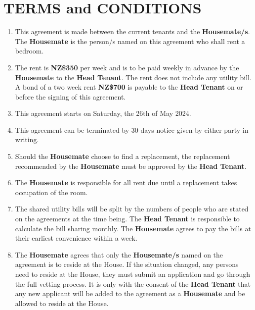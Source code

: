 \documentclass[12pt,a4paper]{article}
\begin{document}
\vspace{1cm}

\section*{TERMS and CONDITIONS}

\begin{enumerate}
\item This agreement is made between the current tenants and the \textbf{Housemate/s}. The \textbf{Housemate} is the person/s named on this agreement who shall rent a bedroom.

\item The rent is \textbf{NZ\$350} per week and is to be paid weekly in advance by the \textbf{Housemate} to the \textbf{Head Tenant}. The rent does not include any utility bill. A bond of a two week rent \textbf{NZ\$700} is payable to the \textbf{Head Tenant} on or before the signing of this agreement.

\item This agreement starts on Saturday, the 26th of May 2024.

\item This agreement can be terminated by 30 days notice given by either party in writing.

\item Should the \textbf{Housemate} choose to find a replacement, the replacement recommended by the \textbf{Housemate} must be approved by the \textbf{Head Tenant}.

\item The \textbf{Housemate} is responsible for all rent due until a replacement takes occupation of the room.

\item The shared utility bills will be split by the numbers of people who are stated on the agreements at the time being. The \textbf{Head Tenant} is responsible to calculate the bill sharing monthly. The \textbf{Housemate} agrees to pay the bills at their earliest convenience within a week.

\item The \textbf{Housemate} agrees that only the \textbf{Housemate/s} named on the agreement is to reside at the House. If the situation changed, any persons need to reside at the House, they must submit an application and go through the full vetting process. It is only with the consent of the \textbf{Head Tenant} that any new applicant will be added to the agreement as a \textbf{Housemate} and be allowed to reside at the House.


\end{enumerate}
\end{document}
